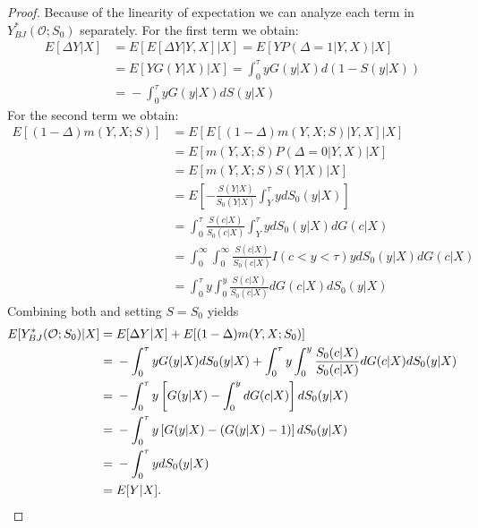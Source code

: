 \documentclass[12pt, a4paper]{scrartcl}
\theoremstyle{definition}
\theoremstyle{plain}
\numberwithin{equation}{section}
\numberwithin{figure}{section}
\numberwithin{table}{section}
\begin{document}
\begin{appendices}
\begin{proof}
			Because of the linearity of expectation we can analyze each term in $Y_{BJ}^*(\mathcal{O}; S_0)$ separately.
			For the first term we obtain:
			\begin{equation*}
			\begin{split}
			E[\Delta Y\vert X] &={} E[E[\Delta Y \vert Y, X]\vert X] = E[Y P(\Delta = 1\vert Y,X)\vert X]\\
			&={} E[Y G(Y\vert X)\vert X] = \int_{0}^{\tau} y G(y\vert X)d(1-S(y\vert X))\\
			&={} - \int_{0}^{\tau} y G(y\vert X)dS(y\vert X)
			\end{split}
			\end{equation*}
			For the second term we obtain:
			\begin{equation*}
			\begin{split}
			E[(1-\Delta)m(Y,X;S)] &={} E[E[(1-\Delta)m(Y,X;S)\vert Y,X]\vert X]\\
			&={} E[m(Y,X;S)P(\Delta = 0\vert Y, X)\vert X]\\
			&={} E[m(Y,X;S)S(Y\vert X)\vert X]\\
			&={} E\left[-\frac{S(Y\vert X)}{S_0(Y\vert X)}\int_{Y}^{\tau}ydS_0(y\vert X)\right]\\
			&={} \int_{0}^{\tau}\frac{S(c\vert X)}{S_0(c\vert X)}\int_{Y}^{\tau}ydS_0(y\vert X)dG(c\vert X)\\
			&={} \int_0^{\infty}\int_0^{\infty} \frac{S(c\vert X)}{S_0(c\vert X)} I(c <y<\tau) y dS_0(y\vert X)dG(c\vert X)\\
			&={} \int_0^{\tau}y\int_0^y \frac{S(c\vert X)}{S_0(c\vert X)} dG(c\vert X)dS_0(y\vert X)
			\end{split}
			\end{equation*}
			Combining both and setting $S=S_0$ yields
			\begin{equation*}
			\begin{split}
			E[Y_{BJ}^*(\mathcal{O}; S_0)\vert X] &= E[\Delta Y\vert X] + E[(1-\Delta)m(Y,X;S_0)]\\
			&={} - \int_{0}^{\tau} y G(y\vert X)dS_0(y\vert X) + \int_0^{\tau}y\int_0^y \frac{S_0(c\vert X)}{S_0(c\vert X)} dG(c\vert X)dS_0(y\vert X)\\
			&={} - \int_{0}^{\tau} y \left[G(y\vert X)-\int_0^ydG(c\vert X)\right]dS_0(y\vert X)\\
			&={} - \int_{0}^{\tau} y \left[G(y\vert X)-(G(y\vert X)-1)\right]dS_0(y\vert X)\\
			&={} - \int_{0}^{\tau} ydS_0(y\vert X)\\
			&={} E[Y\vert X]. \qedhere
			\end{split}
			\end{equation*}
		\end{proof}

\end{appendices}
\end{document}
